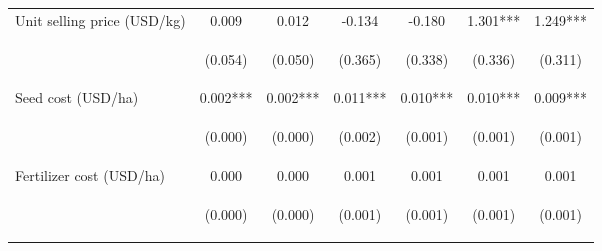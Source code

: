 \begin{center}
\begin{tabular}{lcccccc}
Unit selling price (USD/kg) & 0.009 & 0.012 & -0.134 & -0.180 & 1.301*** & 1.249*** \\
\vspace{4pt} & \begin{footnotesize}(0.054)\end{footnotesize} & \begin{footnotesize}(0.050)\end{footnotesize} & \begin{footnotesize}(0.365)\end{footnotesize} & \begin{footnotesize}(0.338)\end{footnotesize} & \begin{footnotesize}(0.336)\end{footnotesize} & \begin{footnotesize}(0.311)\end{footnotesize} \\
Seed cost (USD/ha) & 0.002*** & 0.002*** & 0.011*** & 0.010*** & 0.010*** & 0.009*** \\
\vspace{4pt} & \begin{footnotesize}(0.000)\end{footnotesize} & \begin{footnotesize}(0.000)\end{footnotesize} & \begin{footnotesize}(0.002)\end{footnotesize} & \begin{footnotesize}(0.001)\end{footnotesize} & \begin{footnotesize}(0.001)\end{footnotesize} & \begin{footnotesize}(0.001)\end{footnotesize} \\
Fertilizer cost (USD/ha) & 0.000 & 0.000 & 0.001 & 0.001 & 0.001 & 0.001 \\
\vspace{4pt} & \begin{footnotesize}(0.000)\end{footnotesize} & \begin{footnotesize}(0.000)\end{footnotesize} & \begin{footnotesize}(0.001)\end{footnotesize} & \begin{footnotesize}(0.001)\end{footnotesize} & \begin{footnotesize}(0.001)\end{footnotesize} & \begin{footnotesize}(0.001)\end{footnotesize} \\

\end{tabular}
\end{center}

